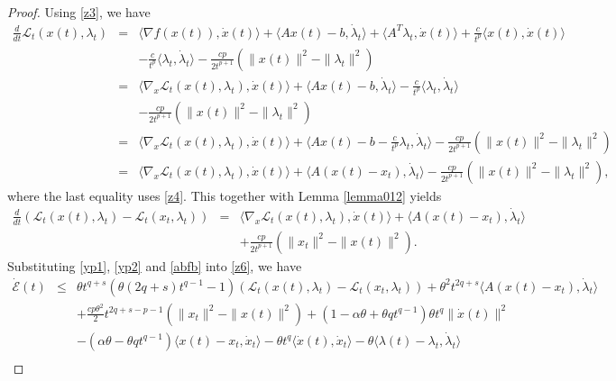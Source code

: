 \documentclass[review]{elsarticle}
\begin{document}
\begin{proof}
Using \eqref{z3}, we have
		\begin{eqnarray*}
			\frac{d}{dt}\mathcal{L}_{t}(x(t),\lambda_t)&=& \langle\nabla f(x(t)), \dot{x}(t)\rangle+\langle Ax(t)-b, \dot{\lambda}_t\rangle+\langle A^T\lambda_t, \dot{x}(t)\rangle+\frac{c}{t^p}\langle x(t), \dot{x}(t)\rangle\\
			&&-\frac{c}{t^p}\langle \lambda_t, \dot{\lambda}_t\rangle-\frac{cp}{2t^{p+1}}\left(\|x(t)\|^2-\|\lambda_t\|^2\right)\\
			&=&\langle\nabla_{x}\mathcal{L}_{t}(x(t),\lambda_t), \dot{x}(t)\rangle+\langle Ax(t)-b, \dot{\lambda}_t\rangle-\frac{c}{t^p}\langle \lambda_t, \dot{\lambda}_t\rangle\\
			&&-\frac{cp}{2t^{p+1}}\left(\|x(t)\|^2-\|\lambda_t\|^2\right)\\
			&=&\langle\nabla_{x}\mathcal{L}_{t}(x(t),\lambda_t), \dot{x}(t)\rangle+\langle Ax(t)-b-\frac{c}{t^p}\lambda_t, \dot{\lambda}_t\rangle-\frac{cp}{2t^{p+1}}\left(\|x(t)\|^2-\|\lambda_t\|^2\right)\\
			&=&\langle\nabla_{x}\mathcal{L}_{t}(x(t),\lambda_t), \dot{x}(t)\rangle+\langle A(x(t)-x_t), \dot{\lambda}_t\rangle-\frac{cp}{2t^{p+1}}\left(\|x(t)\|^2-\|\lambda_t\|^2\right),
		\end{eqnarray*} 
		where the last equality uses \eqref{z4}. This together with  Lemma \ref{lemma012}  yields
		\begin{eqnarray}\label{abfb}
			\frac{d}{dt}\left(\mathcal{L}_{t}(x(t),\lambda_t)-\mathcal{L}_{t}(x_t,\lambda_t)\right)
			&=&\langle\nabla_{x}\mathcal{L}_{t}(x(t),\lambda_t), \dot{x}(t)\rangle+\langle A(x(t)-x_t), \dot{\lambda}_t\rangle\nonumber\\
			&&+\frac{cp}{2t^{p+1}}\left(\|x_t\|^2-\|x(t)\|^2\right).
		\end{eqnarray} 
		Substituting \eqref{yp1}, \eqref{yp2} and \eqref{abfb} into \eqref{z6}, we have 
				\begin{eqnarray}\label{yp3}
			\dot{\mathcal{E}}(t)&\leq&\theta t^{q+s}\left(\theta(2q+s)t^{q-1}-1\right) \left(\mathcal{L}_{t}(x(t),\lambda_t)-\mathcal{L}_{t}(x_t,\lambda_t)\right)+\theta^2t^{2q+s}\langle A(x(t)-x_t), \dot{\lambda}_t\rangle\nonumber\\
			&&+\frac{cp\theta^2}{2}t^{2q+s-p-1}\left(\|x_t\|^2-\|x(t)\|^2\right)+(1-\alpha\theta+\theta qt^{q-1})\theta t^q\|\dot{x}(t)\|^2\nonumber\\
			&&-(\alpha\theta-\theta q t^{q-1})\langle x(t)-x_t, \dot{x}_t\rangle-\theta t^q\langle\dot{x}(t), \dot{x}_t\rangle-\theta\langle \lambda(t)-\lambda_t, \dot{\lambda}_t \rangle\nonumber\\

\end{eqnarray}
\end{proof}
\end{document}
